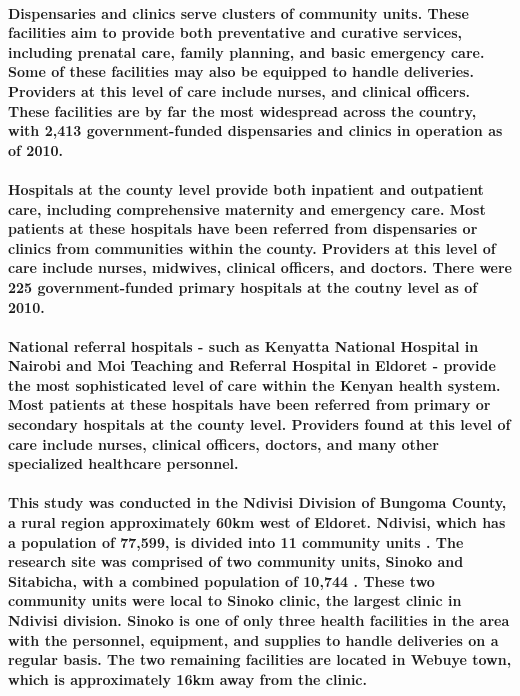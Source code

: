 \paragraph{Dispensaries and clinics serve clusters of community units. These facilities aim to provide both preventative and curative services, including prenatal care, family planning, and basic emergency care. Some of these facilities may also be equipped to handle deliveries. Providers at this level of care include nurses, and clinical officers.  These facilities are by far the most widespread across the country, with 2,413 government-funded dispensaries and clinics in operation as of 2010. \citep{SPA2010}}

\paragraph{Hospitals at the county level provide both inpatient and outpatient care, including comprehensive maternity and emergency care. Most patients at these hospitals have been referred from dispensaries or clinics from communities within the county. Providers at this level of care include nurses, midwives, clinical officers, and doctors. There were 225 government-funded primary hospitals at the coutny level as of 2010. \citep{SPA2010}}

\paragraph{National referral hospitals - such as Kenyatta National Hospital in Nairobi and Moi Teaching and Referral Hospital in Eldoret -  provide the most sophisticated level of care within the Kenyan health system. Most patients at these hospitals have been referred from primary or secondary hospitals at the county level. Providers found at this level of care include nurses, clinical officers, doctors, and many other specialized healthcare personnel. \citep{SPA2010}}

\paragraph{This study was conducted in the Ndivisi Division of Bungoma County, a rural region approximately 60km west of Eldoret. 
Ndivisi, which has a population of 77,599, is divided into 11 community units \citep{Census2009}. The research site was comprised of two community units, Sinoko and Sitabicha, with a combined population of 10,744 \citep{Census2009}. These two community units were local to Sinoko clinic, the largest clinic in Ndivisi division. Sinoko is one of only three health facilities in the area with the personnel, equipment, and supplies to handle deliveries on a regular basis. The two remaining facilities are located in Webuye town, which is approximately 16km away from the clinic.}

